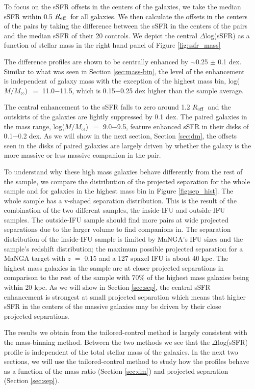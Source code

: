\documentclass[iop,revtex4,twocolumn,apj,numberedappendix,appendixfloats]{emulateapj}
\newcommand{\reff}{$R_{\rm eff}$}
\newcommand{\logm}{log($M/M_{\odot}$)}
\begin{document}
To focus on the sSFR offsets in the centers of the galaxies, we take the median sSFR within 0.5 \reff\ for all galaxies. We then calculate the offsets in the centers of the pairs by taking the difference between the sSFR in the centers of the pairs and the median sSFR of their 20 controls. We depict the central $\Delta$log(sSFR) as a function of stellar mass in the right hand panel of Figure \ref{fig:ssfr_mass}

The difference profiles are shown to be centrally enhanced by $\sim$0.25 $\pm$ 0.1 dex. Similar to what was seen in Section \ref{sec:mass-bin}, the level of the enhancement is independent of galaxy mass with the exception of the highest mass bin, \logm\ $=$ 11.0$-$11.5, which is 0.15$-$0.25 dex higher than the sample average. 

The central enhancement to the sSFR falls to zero around 1.2 \reff\ and the outskirts of the galaxies are lightly suppressed by 0.1 dex. The paired galaxies in the mass range, \logm\ $=$ 9.0$-$9.5, feature enhanced sSFR in their disks of 0.1$-$0.2 dex. As we will show in the next section, Section \ref{sec:dm}, the offsets seen in the disks of paired galaxies are largely driven by whether the galaxy is the more massive or less massive companion in the pair.

To understand why these high mass galaxies behave differently from the rest of the sample, we compare the distribution of the projected separation for the whole sample and for galaxies in the highest mass bin in Figure \ref{fig:sep_hist}. The whole sample has a v-shaped separation distribution. This is the result of the combination of the two different samples, the inside-IFU and outside-IFU samples. The outside-IFU sample should find more pairs at wide projected separations due to the larger volume to find companions in. The separation distribution of the inside-IFU sample is limited by MaNGA's IFU sizes and the sample's redshift distribution; the maximum possible projected separation for a MaNGA target with $z$ $=$ 0.15 and a 127 spaxel IFU is about 40 kpc. The highest mass galaxies in the sample are at closer projected separations in comparison to the rest of the sample with 70\% of the highest mass galaxies being within 20 kpc. As we will show in Section \ref{sec:sep}, the central sSFR enhancement is strongest at small projected separation which means that higher sSFR in the centers of the massive galaxies may be driven by their close projected separations. 

The results we obtain from the tailored-control method is largely consistent with the mass-binning method. Between the two methods we see that the $\Delta$log(sSFR) profile is independent of the total stellar mass of the galaxies. In the next two sections, we will use the tailored-control method to study how the profiles behave as a function of the mass ratio (Section \ref{sec:dm}) and projected separation (Section \ref{sec:sep}).
\end{document}
